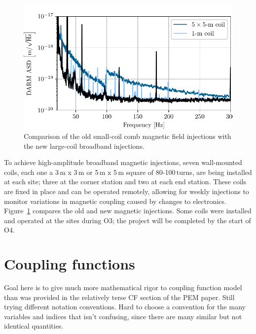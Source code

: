 \begin{figure}[h!]
	\centering
	\includegraphics{figures/wallcoil.pdf}
	\caption{
		Comparison of the old small-coil comb magnetic field injections with the new large-coil broadband injections.}
	\label{fig:wallcoil}
\end{figure}

To achieve high-amplitude broadband magnetic injections, seven wall-mounted coils, each one a 3\,m x 3\,m or 5\,m x 5\,m square of 80-100\,turns, are being installed at each site; three at the corner station and two at each end station. These coils are fixed in place and can be operated remotely, allowing for weekly injections to monitor variations in magnetic coupling caused by changes to electronics. Figure~\ref{fig:wallcoil} compares the old and new magnetic injections. Some coils were installed and operated at the sites during O3; the project will be completed by the start of O4.







\section{Coupling functions}\label{sec:cf}

{\color{red}
Goal here is to give much more mathematical rigor to coupling function model than was provided in the relatively terse CF section of the PEM paper.
Still trying different notation conventions.
Hard to choose a convention for the many variables and indices that isn't confusing, since there are many similar but not identical quantities.}

